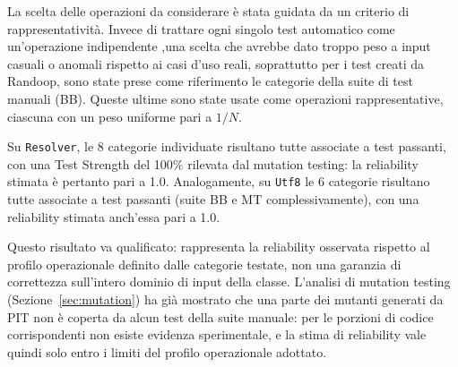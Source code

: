 La scelta delle operazioni da considerare 
è stata guidata da un criterio di rappresentatività. 
Invece di trattare ogni singolo test automatico come un'operazione indipendente 
,una scelta che avrebbe dato troppo peso a input casuali o anomali 
rispetto ai casi d'uso reali, soprattutto per i test creati da Randoop,
sono state prese come riferimento le categorie della suite di test manuali (BB). 
Queste ultime sono state usate come operazioni rappresentative, 
ciascuna con un peso uniforme pari a $1/N$.

Su \texttt{Resolver}, le 8 categorie individuate risultano tutte
associate a test passanti, con una Test Strength del 100\% rilevata
dal mutation testing: la reliability stimata è pertanto pari a 1.0.
Analogamente, su \texttt{Utf8} le 6 categorie risultano tutte associate
a test passanti (suite BB e MT complessivamente), con una reliability
stimata anch'essa pari a 1.0.

Questo risultato va qualificato: rappresenta la reliability osservata
rispetto al profilo operazionale definito dalle categorie testate, non
una garanzia di correttezza sull'intero dominio di input della classe.
L'analisi di mutation testing (Sezione~\ref{sec:mutation}) ha già
mostrato che una parte dei mutanti generati da PIT non è coperta da
alcun test della suite manuale: per le porzioni di codice
corrispondenti non esiste evidenza sperimentale, e la stima di
reliability vale quindi solo entro i limiti del profilo operazionale
adottato.